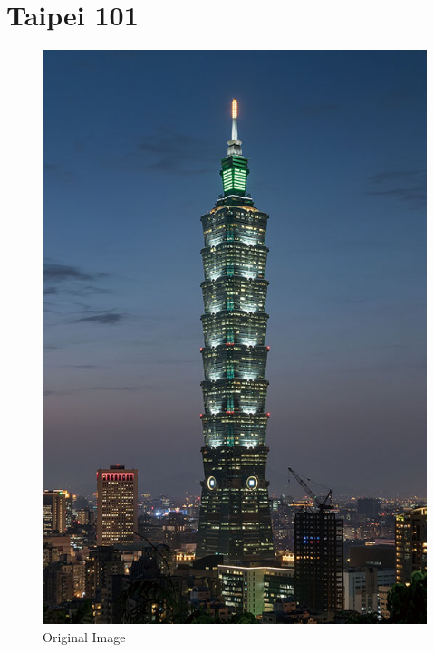 \documentclass[12pt,a4paper]{report}
\begin{document}
\section{Taipei 101}
\begin{figure}[!htb]
  \begin{minipage}{0.49\textwidth}
    \centering
    \includegraphics[width=0.9\linewidth]{test_img/taipei101.png}
    \caption{Original Image}\label{Fig:Data1}
  \end{minipage}\hfill
  \begin{minipage}{0.49\textwidth}
    \centering

\end{minipage}
\end{figure}
\end{document}
